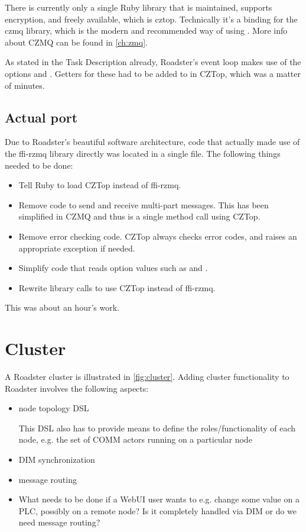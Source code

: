 There is currently only a single Ruby library that is maintained, supports
encryption, and freely available, which is \gls{cztop}. Technically it's a
binding for the \gls{czmq} library, which is the modern and recommended way of
using \zmq. More info about CZMQ can be found in \autoref{ch:zmq}.

As stated in the Task Description already, Roadster's event loop makes use of
the \zmq options  and . Getters for these had to be
added to in CZTop, which was a matter of minutes.

\subsection{Actual port}
Due to Roadster's beautiful software architecture, code that actually made use
of the ffi-rzmq library directly was located in a single file. The following
things needed to be done:

\begin{itemize}
\item Tell Ruby to load CZTop instead of ffi-rzmq.
\item Remove code to send and receive multi-part messages. This has been simplified
in CZMQ and thus is a single method call using CZTop.
\item Remove error checking code. CZTop always checks error codes, and raises
an appropriate exception if needed.
\item Simplify code that reads option values such as  and .
\item Rewrite library calls to use CZTop instead of ffi-rzmq.
\end{itemize}

This was about an hour's work.

\section{Cluster}\label{sec:approach:cluster}
A Roadster cluster is illustrated in \autoref{fig:cluster}. Adding cluster
functionality to Roadster involves the following aspects:
\begin{itemize}
	\item node topology DSL

		This DSL also has to provide means to define the roles/functionality of each node, e.g. the set of COMM actors running on a particular node

	\item DIM synchronization
	\item message routing
	\item What needs to be done if a WebUI user wants to e.g. change some value on a PLC, possibly on a remote node? Is it completely handled via DIM or do we need message routing?
\end{itemize}

